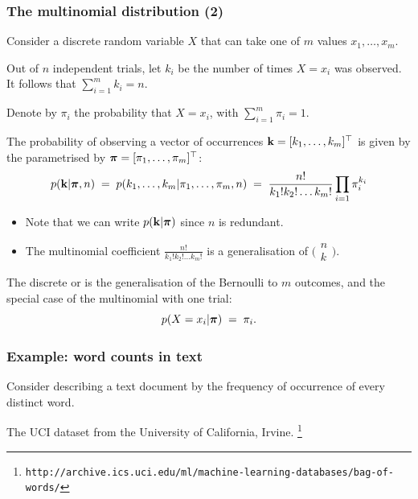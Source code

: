 \begin{frame}
\frametitle{The multinomial distribution (2)}

Consider a discrete random variable $X$ that can take one of $m$
values $x_1,\ldots,x_m$.

Out of $n$ independent trials, let $k_i$ be the number of
times $X=x_i$ was observed.\\
It follows that $\sum_{i=1}^m k_i=n$.

Denote by $\pi_i$ the probability that $X=x_i$, with
$\sum_{i=1}^m \pi_i=1$.

The probability of observing a vector of occurrences
$\mathbf k=[k_1,\ldots,k_m]^\top$ is given by the  parametrised by $\boldsymbol{\pi}=[\pi_1,\ldots,\pi_m]^\top$:
%
\[
p(\mathbf k|\boldsymbol{\pi},n)\;=\; p(k_1,\ldots,k_m|\pi_1,\ldots,\pi_m,n) 
\;=\;\frac{n!}{k_1!k_2!\ldots k_m!}\prod_{i=1} \pi_i^{k_i}
\]
\vspace*{-2ex}
\begin{itemize}
\item Note that we can write $p(\mathbf k|\boldsymbol{\pi})$ since $n$ is redundant.
\item The multinomial coefficient $\frac{n!}{k_1!k_2!\ldots k_m!}$ is a
 generalisation of
 $\big(\!\!\begin{array}{c}n\\k\end{array}\!\!\big)$.
\end{itemize}

The discrete or  is the
  generalisation of the Bernoulli to $m$ outcomes, and the special
  case of the multinomial with one trial:
\[
p(X=x_i|\boldsymbol{\pi})\;=\;\pi_i.
\]

\end{frame}

\begin{frame}
\frametitle{Example: word counts in text}

Consider describing a text document by the frequency of occurrence of every distinct word.

The UCI  dataset from the University of California, Irvine. 
\texttt{\footnote{http://archive.ics.uci.edu/ml/machine-learning-databases/bag-of-words/}}

\end{frame}


